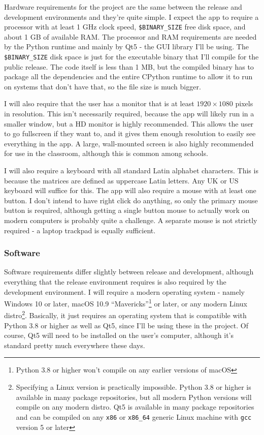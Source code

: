 \documentclass[../main.tex]{subfiles}
\begin{document}
Hardware requirements for the project are the same between the release and development environments and they're quite simple. I expect the app to require a processor with at least 1 GHz clock speed, \texttt{\$BINARY\_SIZE} free disk space, and about 1 GB of available RAM. The processor and RAM requirements are needed by the Python runtime and mainly by Qt5 - the GUI library I'll be using. The \texttt{\$BINARY\_SIZE} disk space is just for the executable binary that I'll compile for the public release. The code itself is less than 1 MB, but the compiled binary has to package all the dependencies and the entire CPython runtime to allow it to run on systems that don't have that, so the file size is much bigger.

I will also require that the user has a monitor that is at least $1920 \times 1080$ pixels in resolution. This isn't necessarily required, because the app will likely run in a smaller window, but a HD monitor is highly recommended. This allows the user to go fullscreen if they want to, and it gives them enough resolution to easily see everything in the app. A large, wall-mounted screen is also highly recommended for use in the classroom, although this is common among schools.

I will also require a keyboard with all standard Latin alphabet characters. This is because the matrices are defined as uppercase Latin letters. Any UK or US keyboard will suffice for this. The app will also require a mouse with at least one button. I don't intend to have right click do anything, so only the primary mouse button is required, although getting a single button mouse to actually work on modern computers is probably quite a challenge. A separate mouse is not strictly required - a laptop trackpad is equally sufficient.

\subsubsection{Software\label{analysis:hardware-and-software-requirements:software}}


Software requirements differ slightly between release and development, although everything that the release environment requires is also required by the development environment. I will require a modern operating system - namely Windows 10 or later, macOS 10.9 \enquote{Mavericks}\footnote{Python 3.8 or higher won't compile on any earlier versions of macOS\cite{python-3-10-downloads-page}} or later, or any modern Linux distro\footnote{Specifying a Linux version is practically impossible. Python 3.8 or higher is available in many package repositories, but all modern Python versions will compile on any modern distro. Qt5 is available in many package repositories and can be compiled on any \texttt{x86} or \texttt{x86\_64} generic Linux machine with \texttt{gcc} version 5 or later\cite{qt5-linux-build-dependencies}}. Basically, it just requires an operating system that is compatible with Python 3.8 or higher as well as Qt5, since I'll be using these in the project. Of course, Qt5 will need to be installed on the user's computer, although it's standard pretty much everywhere these days.
\end{document}
